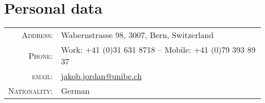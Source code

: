 \section{Personal data}

\begin{longtable}{rl}
\textsc{Address:} & Wabernstrasse 98, 3007, Bern, Switzerland \\
\textsc{Phone:} & Work: +41 (0)31 631 8718 -- Mobile: +41 (0)79 393 89 37 \\
\textsc{email:} & \href{mailto:jakob.jordan@unibe.ch}{jakob.jordan@unibe.ch} \\
\textsc{Nationality:} & German
\end{longtable}

